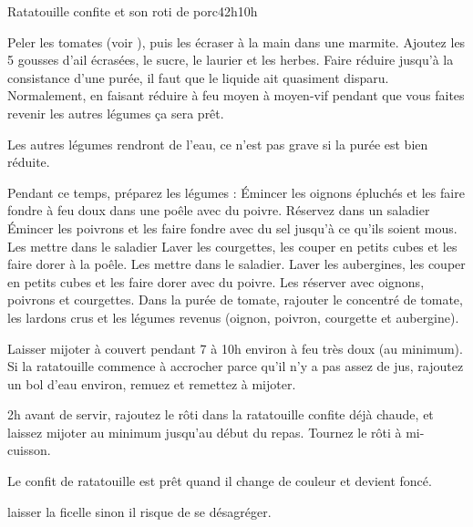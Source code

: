 {\begin{recette}{Ratatouille confite et son roti de porc}{4}{2h}{10h}
\begin{preparation}
\etape Peler les tomates (voir ), puis les écraser à la main dans une marmite. Ajoutez les 5 gousses 
d'ail écrasées, le sucre, le laurier et les herbes. 
\etape Faire réduire jusqu'à la consistance d'une purée, il faut que le liquide ait quasiment disparu. Normalement, en faisant 
réduire à feu moyen à moyen-vif pendant que vous faites revenir les autres légumes ça sera prêt. 
\begin{remarque}
Les autres légumes rendront de l'eau, ce n'est pas grave si la purée est bien réduite.
\end{remarque}
\etape Pendant ce temps, préparez les légumes : 
\etape Émincer les oignons épluchés et les faire fondre à feu doux dans une poêle avec du poivre. Réservez dans un saladier
\etape Émincer les poivrons et les faire fondre avec du sel jusqu'à ce qu'ils soient mous. Les mettre dans le saladier
\etape Laver les courgettes, les couper en petits cubes et les faire dorer à la poêle. Les mettre dans le saladier.
\etape Laver les aubergines, les couper en petits cubes et les faire dorer avec du poivre. Les réserver avec oignons, poivrons 
et courgettes.
\etape Dans la purée de tomate, rajouter le concentré de tomate, les lardons crus et les légumes revenus (oignon, poivron, 
courgette et aubergine).
\end{preparation}

\begin{cuisson}
Laisser mijoter à couvert pendant 7 à 10h environ à feu très doux (au minimum). Si la ratatouille commence à accrocher parce 
qu'il n'y a pas assez de jus, rajoutez un bol d'eau environ, remuez et remettez à mijoter.

2h avant de servir, rajoutez le rôti dans la ratatouille confite déjà chaude, et laissez mijoter au minimum jusqu'au début du 
repas. Tournez le rôti à mi-cuisson.

Le confit de ratatouille est prêt quand il change de couleur et devient foncé. 

laisser la ficelle sinon il risque de se désagréger.
\end{cuisson}
\end{recette}

}
